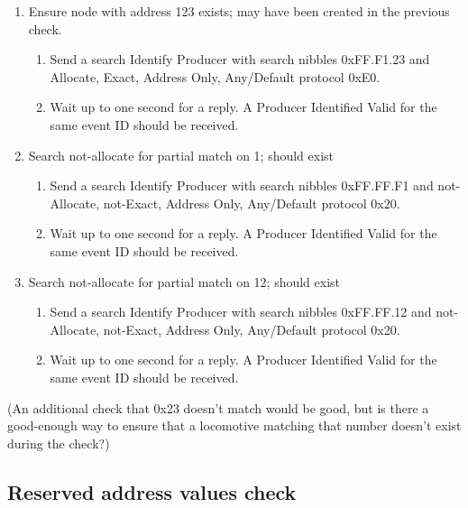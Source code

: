 \begin{enumerate}

\item Ensure node with address 123 exists; may have been created in the previous check.

    \begin{enumerate}
    \item Send a search Identify Producer with search nibbles 0xFF.F1.23 and 
        Allocate, Exact, Address Only, Any/Default protocol 0xE0.

    \item Wait up to one second for a reply.  A Producer Identified Valid for the same event ID
        should be received.
    \end{enumerate}

\item Search not-allocate for partial match on 1; should exist
    \begin{enumerate}
    \item Send a search Identify Producer with search nibbles 0xFF.FF.F1 and 
        not-Allocate, not-Exact, Address Only, Any/Default protocol 0x20.

    \item Wait up to one second for a reply.  A Producer Identified Valid for the same event ID
        should be received.
    \end{enumerate}

\item Search not-allocate for partial match on 12; should exist
    \begin{enumerate}
    \item Send a search Identify Producer with search nibbles 0xFF.FF.12 and 
        not-Allocate, not-Exact, Address Only, Any/Default protocol 0x20.

    \item Wait up to one second for a reply.  A Producer Identified Valid for the same event ID
        should be received.
    \end{enumerate}

\end{enumerate}

(An additional check that 0x23 doesn't match would be good, but is there a good-enough way
to ensure that a locomotive matching that number doesn't exist during the check?)

\subsection{Reserved address values check}

